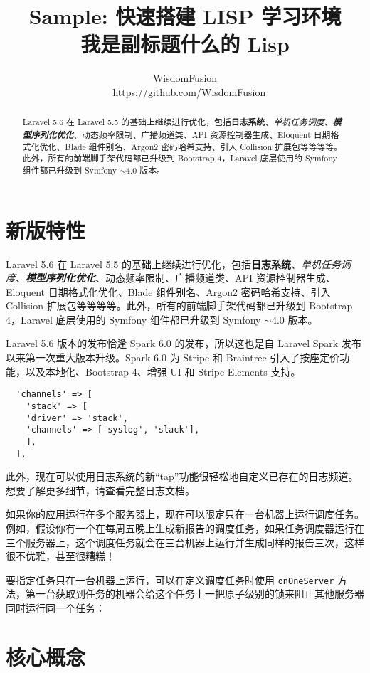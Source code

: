 \documentclass{progartcn}
\title{\bfseries\sffamily Sample: 快速搭建 LISP 学习环境 \\ \normalfont\zihao{3} 我是副标题什么的 Lisp}
\author{WisdomFusion \\ \faGithubAlt~ https://github.com/WisdomFusion}
\date{}
\begin{document}
\maketitle


\begin{abstract}
\noindent Laravel 5.6 在 Laravel 5.5 的基础上继续进行优化，包括\textbf{日志系统}、\textit{单机任务调度}、\textbf{\textit{模型序列化优化}}、动态频率限制、广播频道类、API 资源控制器生成、Eloquent 日期格式化优化、Blade 组件别名、Argon2 密码哈希支持、引入 Collision 扩展包等等等等。此外，所有的前端脚手架代码都已升级到 Bootstrap 4，Laravel 底层使用的 Symfony 组件都已升级到 Symfony $\sim$4.0 版本。
\end{abstract}

\section{新版特性}
\label{newfeatures}

Laravel 5.6 在 Laravel 5.5 的基础上继续进行优化，包括\textbf{日志系统}、\textit{单机任务调度}、\textbf{\textit{模型序列化优化}}、动态频率限制、广播频道类、API 资源控制器生成、Eloquent 日期格式化优化、Blade 组件别名、Argon2 密码哈希支持、引入 Collision 扩展包等等等等。此外，所有的前端脚手架代码都已升级到 Bootstrap 4，Laravel 底层使用的 Symfony 组件都已升级到 Symfony $\sim$4.0 版本。

Laravel 5.6 版本的发布恰逢 Spark 6.0 的发布，所以这也是自 Laravel Spark 发布以来第一次重大版本升级。Spark 6.0 为 Stripe 和 Braintree 引入了按座定价功能，以及本地化、Bootstrap 4、增强 UI 和 Stripe Elements 支持。


\begin{lstlisting}
  'channels' => [
    'stack' => [
    'driver' => 'stack',
    'channels' => ['syslog', 'slack'],
    ],
  ],
\end{lstlisting}

此外，现在可以使用日志系统的新``tap''功能很轻松地自定义已存在的日志频道。想要了解更多细节，请查看完整日志文档。

如果你的应用运行在多个服务器上，现在可以限定只在一台机器上运行调度任务。例如，假设你有一个在每周五晚上生成新报告的调度任务，如果任务调度器运行在三个服务器上，这个调度任务就会在三台机器上运行并生成同样的报告三次，这样很不优雅，甚至很糟糕！

要指定任务只在一台机器上运行，可以在定义调度任务时使用 \verb|onOneServer| 方法，第一台获取到任务的机器会给这个任务上一把原子级别的锁来阻止其他服务器同时运行同一个任务：


\section{核心概念}
\end{document}
